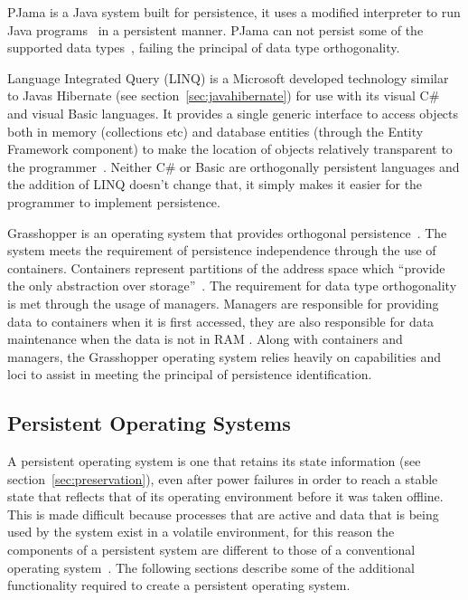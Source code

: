 \documentclass[a4paper,12pt]{article}
\begin{document}
\par
\label{sec:pjama}
PJama is a Java system built for persistence, it uses a modified interpreter to run Java programs~\citep{persistentjavasystem} in a persistent manner. PJama can not persist some of the supported data types~\citep{ADearle}, failing the principal of data type orthogonality. 
\par
Language Integrated Query (LINQ)
is a Microsoft developed technology similar to Javas Hibernate (see section~\ref{sec:javahibernate}) for use with its visual C\# and visual Basic languages. It provides a single generic interface to access objects both in memory (collections etc) and database entities (through the Entity Framework component) to make the location of objects relatively transparent to the programmer~\citep{ADearle}.
Neither C\# or Basic are orthogonally persistent languages and the addition of LINQ doesn't change that, it simply makes it easier for the programmer to implement persistence.
\par
Grasshopper\label{sec:grasshopper} 
is an operating system that provides orthogonal persistence~\citep{Grasshopper}. 
The system meets the requirement of persistence independence through the use of containers. Containers represent partitions of the address space which ``provide the only abstraction over storage''~\citep[p~3]{Grasshopper}.
The requirement for data type orthogonality is met through the usage of managers. Managers are responsible for providing data to containers when it is first accessed, they are also responsible for data maintenance when the data is not in RAM \citep{Grasshopper}.
Along with containers and managers, the Grasshopper operating system relies heavily on capabilities and loci to assist in meeting the principal of persistence identification.
\par
\subsection{Persistent Operating Systems}\label{sec:persistentOS}
A persistent operating system is one that retains its state information (see section~\ref{sec:preservation}), even after power failures in order to reach a stable state that reflects that of its operating environment before it was taken offline. This is made difficult because processes that are active and data that is being used by the system exist in a volatile environment, for this reason the components of a persistent system are different to those of a conventional operating system~\citep{Grasshopper}. The following sections describe some of the additional functionality required to create a persistent operating system.
\end{document}
